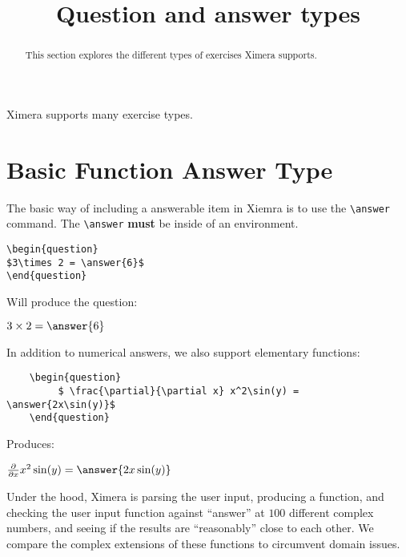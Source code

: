 \documentclass{ximera}
\title{Question and answer types}
\begin{document}
\begin{abstract}
  This section explores the different types of exercises Ximera supports. 
\end{abstract}
\maketitle

Ximera supports many exercise types.


\section{Basic Function Answer Type}

The basic way of including a answerable item in Xiemra is to use the
\verb|\answer| command. The \verb|\answer| \textbf{must} be inside of
an environment.

\begin{verbatim}
\begin{question}
$3\times 2 = \answer{6}$
\end{question}
\end{verbatim}

Will produce the question:

\begin{question}
  $3\times 2 = \answer{6}$
\end{question}

In addition to numerical answers, we also support elementary functions:

\begin{verbatim}
    \begin{question}
         $ \frac{\partial}{\partial x} x^2\sin(y) =  \answer{2x\sin(y)}$
    \end{question}
\end{verbatim}

Produces:

\begin{question}
  $\frac{\partial}{\partial x} x^2\sin(y) = \answer{2x\sin(y)}$
\end{question}

\begin{remark}
Under the hood, Ximera is parsing the user input, producing a
function, and checking the user input function against ``answer'' at
$100$ different complex numbers, and seeing if the results are
``reasonably'' close to each other.  We compare the complex extensions
of these functions to circumvent domain issues.
\end{remark}
\end{document}

